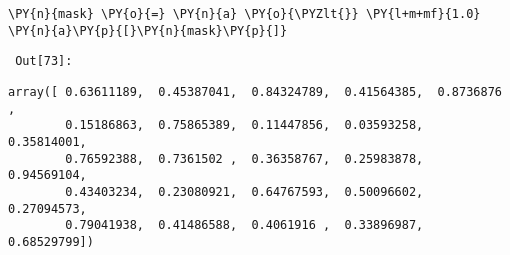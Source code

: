 {\par%
\vspace{-1\baselineskip}%
}%
\begin{notebookcell}[73]%
\begin{addmargin}[\cellleftmargin]{0em}%
{\smaller%
\par%
%
\vspace{-1\smallerfontscale}%
\begin{Verbatim}[commandchars=\\\{\}]
\PY{n}{mask} \PY{o}{=} \PY{n}{a} \PY{o}{\PYZlt{}} \PY{l+m+mf}{1.0}
\PY{n}{a}\PY{p}{[}\PY{n}{mask}\PY{p}{]}
\end{Verbatim}
%
\par%
\vspace{-1\smallerfontscale}}%
\end{addmargin}
\end{notebookcell}

\par\vspace{1\smallerfontscale}%
    
        {\par%
        \vspace{-1\smallerfontscale}%
        \noindent%
        \begin{minipage}{\cellleftmargin}%
    \hfill%
    {\smaller%
    \tt%
    \color{nbframe-out-prompt}%
    Out[73]:}%
    \hspace{\inputpadding}%
    \hspace{0em}%
    \hspace{3pt}%
    \end{minipage}%
        }%
    \begin{addmargin}[\cellleftmargin]{0em}%
    {\smaller%
    \vspace{-1\smallerfontscale}%
    
    
    
    \begin{verbatim}
array([ 0.63611189,  0.45387041,  0.84324789,  0.41564385,  0.8736876 ,
        0.15186863,  0.75865389,  0.11447856,  0.03593258,  0.35814001,
        0.76592388,  0.7361502 ,  0.36358767,  0.25983878,  0.94569104,
        0.43403234,  0.23080921,  0.64767593,  0.50096602,  0.27094573,
        0.79041938,  0.41486588,  0.4061916 ,  0.33896987,  0.68529799])
    \end{verbatim}

    
}%
    \end{addmargin}%

